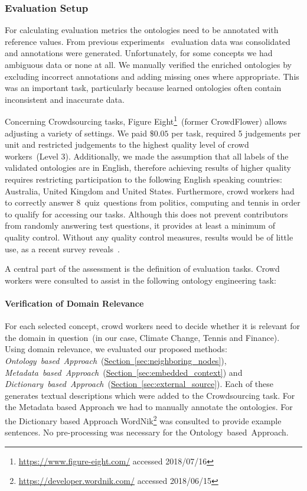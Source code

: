 \subsubsection{Evaluation Setup}
For calculating evaluation metrics the ontologies need to be annotated with reference values. From previous experiments~\cite{wohlgenannt2016} evaluation data was consolidated and annotations were generated. Unfortunately, for some concepts we had ambiguous data or none at all. We manually verified the enriched ontologies by excluding incorrect annotations and adding missing ones where appropriate. This was an important task, particularly because learned ontologies often contain inconsistent and inaccurate data. 

Concerning Crowdsourcing tasks, Figure Eight\footnote{\url{https://www.figure-eight.com/} accessed 2018/07/16}~(former CrowdFlower) allows adjusting a variety of settings. We paid $\$0.05$ per task, required 5 judgements per unit and restricted judgements to the highest quality level of crowd workers~(Level 3). Additionally, we made the assumption that all labels of the validated ontologies are in English, therefore achieving results of higher quality requires restricting participation to the following English speaking countries: Australia, United Kingdom and United States. Furthermore, crowd workers had to correctly answer 8~quiz~questions from politics, computing and tennis in order to qualify for accessing our tasks. Although this does not prevent contributors from randomly answering test questions, it provides at least a minimum of quality control. Without any quality control measures, results would be of little use, as a recent survey reveals~\cite{daniel2018}. 

A central part of the assessment is the definition of evaluation tasks. Crowd workers were consulted to assist in the following ontology engineering task: 

\paragraph{Verification of Domain Relevance} For each selected concept, crowd workers need to decide whether it is relevant for the domain in question~(in our case, Climate Change, Tennis and Finance).
Using domain relevance, we evaluated our proposed methods:
\emph{Ontology~based~Approach}~(\hyperref[sec:neighboring_nodes]{Section~\ref*{sec:neighboring_nodes}}),
\emph{Metadata~based~Approach}~(\hyperref[sec:embedded_context]{Section~\ref*{sec:embedded_context}}) and
\emph{Dictionary~based~Approach}~(\hyperref[sec:external_source]{Section~\ref*{sec:external_source}}).
Each of these generates textual descriptions which were added to the Crowdsourcing task. For the Metadata based Approach we had to manually annotate the ontologies. For the Dictionary based Approach WordNik\footnote{\url{https://developer.wordnik.com/} accessed 2018/06/15} was consulted to provide example sentences. No pre-processing was necessary for the Ontology~based~Approach. 

